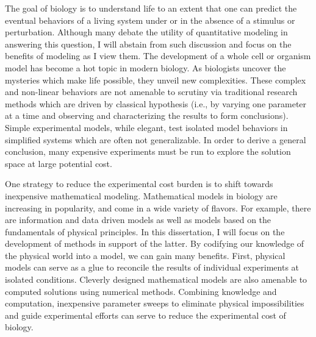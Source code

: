 
\par The goal of biology is to understand life to an extent that one can predict the eventual behaviors of a living system under or in the absence of a stimulus or perturbation.
Although many debate the utility of quantitative modeling in answering this question, I will abstain from such discussion and focus on the benefits of modeling as I view them.
The development of a whole cell or organism model has become a hot topic in modern biology\cite{Roberts2014}.
As biologists uncover the mysteries which make life possible, they unveil new complexities\cite{CheckHayden2010}.
These complex and non-linear behaviors are not amenable to scrutiny via traditional research methods which are driven by classical hypothesis (i.e., by varying one parameter at a time and observing and characterizing the results to form conclusions).
Simple experimental models, while elegant, test isolated model behaviors in simplified systems which are often not generalizable.
In order to derive a general conclusion, many expensive experiments must be run to explore the solution space at large potential cost.

\par One strategy to reduce the experimental cost burden is to shift towards inexpensive mathematical modeling.
Mathematical models in biology are increasing in popularity, and come in a wide variety of flavors\cite{Gunawardena2014}.
For example, there are information and data driven models as well as models based on the fundamentals of physical principles.
In this dissertation, I will focus on the development of methods in support of the latter.
By codifying our knowledge of the physical world into a model, we can gain many benefits.
First, physical models can serve as a glue to reconcile the results of individual experiments at isolated conditions.
Cleverly designed mathematical models are also amenable to computed solutions using numerical methods.
Combining knowledge and computation, inexpensive parameter sweeps to eliminate physical impossibilities and guide experimental efforts can serve to reduce the experimental cost of biology.

